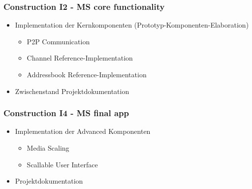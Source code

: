 		\subsubsection{Construction I2 - MS core functionality}
			\begin{itemize}
				\item Implementation der Kernkomponenten (Prototyp-Komponenten-Elaboration)
					\begin{itemize}
						\item P2P Communication
						\item Channel Reference-Implementation
						\item Addressbook Reference-Implementation
					\end{itemize}
				\item Zwischenstand Projektdokumentation
			\end{itemize}
			
		\subsubsection{Construction I4 - MS final app}
			\begin{itemize}
				\item Implementation der Advanced Komponenten
					\begin{itemize}
						\item Media Scaling
						\item Scallable User Interface
					\end{itemize}
				\item Projektdokumentation
			\end{itemize}
	

